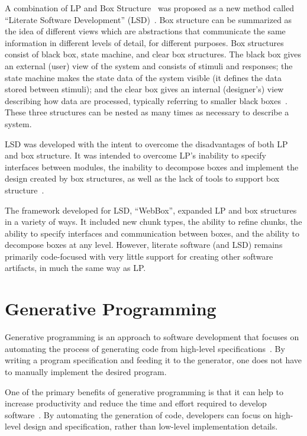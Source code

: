 A combination of LP and Box Structure~\cite{Mills1986} was proposed as a new
method called ``Literate Software Development''
(LSD)~\cite{AlMatiiAndBoujarwah2002}. Box structure can be summarized as the
idea of different views which are abstractions that communicate the same
information in different levels of detail, for different purposes. Box
structures consist of black box, state machine, and clear box structures. The
black box gives an external (user) view of the system and consists of stimuli
and responses; the state machine makes the state data of the system visible (it
defines the data stored between stimuli); and the clear box gives an internal
(designer's) view describing how data are processed, typically referring to
smaller black boxes~\cite{Mills1986}. These three structures can be nested as
many times as necessary to describe a system.

LSD was developed with the intent to overcome the disadvantages of both LP and
box structure. It was intended to overcome LP's inability to specify interfaces
between modules, the inability to decompose boxes and implement the design
created by box structures, as well as the lack of tools to support box
structure~\cite{Deck1996}.

The framework developed for LSD, ``WebBox'', expanded LP and box structures in a
variety of ways. It included new chunk types, the ability to refine chunks, the
ability to specify interfaces and communication between boxes, and the ability
to decompose boxes at any level. However, literate software (and LSD) remains
primarily code-focused with very little support for creating other software
artifacts, in much the same way as LP.

\section{Generative Programming}

Generative programming is an approach to software development that focuses on 
automating the process of generating code from high-level 
specifications~\cite{Czarnecki2000,Taha2006}. By writing a program 
specification and feeding it to the generator, one does not have to manually 
implement the desired program.

One of the primary benefits of generative programming is that it can help to 
increase productivity and reduce the time and effort required to develop 
software~\cite{Czarnecki2000}. By automating the generation of code, developers 
can focus on high-level design and specification, rather than low-level 
implementation details.

